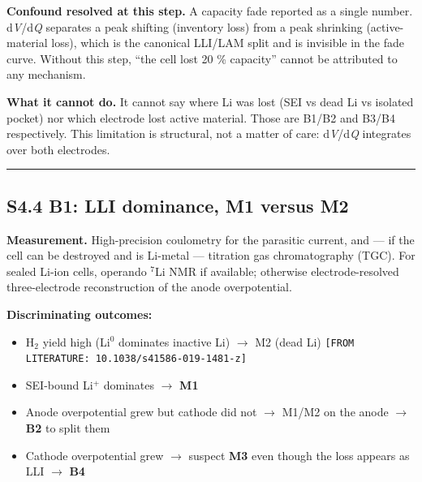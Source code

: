 \documentclass[11pt,a4paper]{article}
\begin{document}
\textbf{Confound resolved at this step.} A capacity fade reported as a single number. d\emph{V}/d\emph{Q} separates a peak shifting (inventory loss) from a peak shrinking (active-material loss), which is the canonical LLI/LAM split and is invisible in the fade curve. Without this step, \textquotedblleft{}the cell lost 20 \% capacity\textquotedblright{} cannot be attributed to any mechanism.


\textbf{What it cannot do.} It cannot say where Li was lost (SEI vs dead Li vs isolated pocket) nor which electrode lost active material. Those are B1/B2 and B3/B4 respectively. This limitation is structural, not a matter of care: d\emph{V}/d\emph{Q} integrates over both electrodes.


\par\noindent\rule{\linewidth}{0.4pt}\par


\subsection*{S4.4 B1: LLI dominance, M1 versus M2}


\textbf{Measurement.} High-precision coulometry for the parasitic current, and --- if the cell can be destroyed and is Li-metal --- titration gas chromatography (TGC). For sealed Li-ion cells, operando \ensuremath{^{7}}Li NMR if available; otherwise electrode-resolved three-electrode reconstruction of the anode overpotential.


\textbf{Discriminating outcomes:}


\begin{itemize}
  \item H\ensuremath{_{2}} yield high (Li\ensuremath{^{0}} dominates inactive Li) \ensuremath{\rightarrow} M2 (dead Li) \texttt{[FROM LITERATU}\hspace{0pt}\texttt{RE: 10.1038/}\hspace{0pt}\texttt{s41586-019-}\hspace{0pt}\texttt{1481-z]}
  \item SEI-bound Li\ensuremath{^{+}} dominates \ensuremath{\rightarrow} \textbf{M1}
  \item Anode overpotential grew but cathode did not \ensuremath{\rightarrow} M1/M2 on the anode \ensuremath{\rightarrow} \textbf{B2} to split them
  \item Cathode overpotential grew \ensuremath{\rightarrow} suspect \textbf{M3} even though the loss appears as LLI \ensuremath{\rightarrow} \textbf{B4}
\end{itemize}
\end{document}
